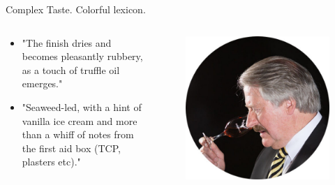 \documentclass{beamer}
\begin{document}
	\begin{frame}{Complex Taste. Colorful lexicon.}
	\begin{columns}
		\begin{column}{0.5\textwidth}
			\begin{itemize}
				\item "The finish dries and becomes pleasantly rubbery, as a touch of truffle oil emerges."
				\item "Seaweed-led, with a hint of vanilla ice cream and more than a whiff of notes from the first aid box (TCP, plasters etc)."
			\end{itemize}

		\end{column}
		\begin{column}{0.5\textwidth}
			\begin{figure}[H]
				\begin{center}
					\includegraphics[scale = 0.14]{richpaterson_nosing}
				\end{center}
			\end{figure}
		\end{column}
		
		
	\end{columns}
\end{frame}
\end{document}
